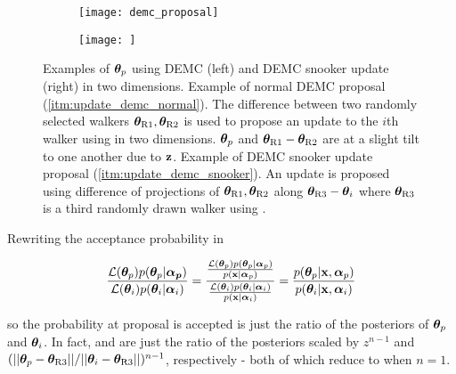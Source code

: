 \begin{figure}
\centering
\begin{subfigure}[t]{0.5\textwidth}
\centering
\texttt{[image: demc\_proposal]}
\end{subfigure}%
\begin{subfigure}[t]{0.5\textwidth}
\centering
\texttt{[image: ]}
\end{subfigure}
\caption{Examples of $\boldsymbol{\theta}_p$ using DEMC (left) and DEMC snooker update (right) in two dimensions.  Example of normal DEMC
proposal (\cref{itm:update_demc_normal}).  The difference between two randomly selected walkers
$\boldsymbol{\theta}_{\mathrm{R1}}, \boldsymbol{\theta}_{\mathrm{R2}}$ is used to propose an update to the $i$th walker using
 in two dimensions.  $\boldsymbol{\theta}_p$ and
$\boldsymbol{\theta}_{\mathrm{R1}} - \boldsymbol{\theta}_{\mathrm{R2}}$ are at a slight tilt to one another due to $\mathbf{z}$.  Example
of DEMC snooker update proposal (\cref{itm:update_demc_snooker}).  An update is proposed using difference of projections of
$\boldsymbol{\theta}_{\mathrm{R1}}, \boldsymbol{\theta}_{\mathrm{R2}}$ along $\boldsymbol{\theta}_{\mathrm{R3}} - \boldsymbol{\theta}_i$ where
$\boldsymbol{\theta}_{\mathrm{R3}}$ is a third randomly drawn walker using .}
\label{fig:elifetime_fit_mcmc_demc_diagram}
\end{figure}

Rewriting the acceptance probability in 

\begin{equation}
\frac{\mathcal{L}(\boldsymbol{\theta}_p) p(\boldsymbol{\theta}_p|\boldsymbol{\alpha_p})}
{\mathcal{L}(\boldsymbol{\theta}_i) p(\boldsymbol{\theta}_i|\boldsymbol{\alpha}_i)} =
\dfrac{\frac{\mathcal{L}(\boldsymbol{\theta}_p) p(\boldsymbol{\theta}_p|\boldsymbol{\alpha}_p)}{p(\mathbf{x}|\boldsymbol{\alpha}_p)}}
{\frac{\mathcal{L}(\boldsymbol{\theta}_i) p(\boldsymbol{\theta}_i|\boldsymbol{\alpha}_i)}{p(\mathbf{x}|\boldsymbol{\alpha}_i)}} =
\frac{p(\boldsymbol{\theta}_p|\mathbf{x}, \boldsymbol{\alpha}_p)}{p(\boldsymbol{\theta}_i|\mathbf{x}, \boldsymbol{\alpha}_i)}
\label{eq:elifetime_fit_mcmc_acc_ratio}
\end{equation}

\noindent so the probability at proposal is accepted is just the ratio of the posteriors of $\boldsymbol{\theta}_p$ and
$\boldsymbol{\theta}_i$.  In fact,  and
 are just the ratio of the posteriors scaled by $z^{n-1}$ and
$(||\boldsymbol{\theta}_p - \boldsymbol{\theta}_{\mathrm{R3}}|| / ||\boldsymbol{\theta}_i - \boldsymbol{\theta}_{\mathrm{R3}}||)^{n - 1}$, respectively - both
of which reduce to  when $n = 1$.


